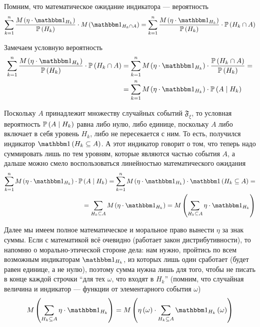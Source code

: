 Помним, что математическое ожидание индикатора --- вероятность
$$\sum_{k=1}^n
    \frac{\mean{\left( \eta \cdot \indicatorof{H_k} \right)}}{\probability{H_k}}
        \cdot \mean{\left( \indicatorof{H_k \cap A} \right)}
    = \sum_{k=1}^n \frac{\mean{\left( \eta \cdot \indicatorof{H_k} \right)}}
        {\probability{H_k}}
        \cdot \probability{H_k \cap A}$$

Замечаем условную вероятность
\begin{align*}
    \sum_{k=1}^n \frac{\mean{\left( \eta \cdot \indicatorof{H_k} \right)}}
        {\probability{H_k}} \cdot \probability{H_k \cap A}
    &= \sum_{k=1}^n \mean{\left( \eta \cdot \indicatorof{H_k} \right)}
        \cdot \frac{\probability{H_k \cap A}}{\probability{H_k}} = \\
    &= \sum_{k=1}^n \mean{\left( \eta \cdot \indicatorof{H_k} \right)}
        \cdot \probability{A \mid H_k}
\end{align*}

Поскольку $A$ принадлежит множеству случайных событий $\mathfrak{F}_\xi$,
то условная вероятность $\mathbb{P}\left( A\mid H_k \right)$ равна либо нулю, либо единице,
поскольку $A$ либо включает в себя уровень $H_k$, либо не пересекается с ним.
То есть, получился индикатор $\indicator{H_k \subseteq A}$.
А этот индикатор говорит о том, что теперь надо суммировать лишь по тем уровням,
которые являются частью события $A$,
а дальше можно смело воспользоваться линейностью математического ожидания
\begin{align*}
\sum_{k=1}^n \mean{\left( \eta \cdot \indicatorof{H_k} \right)}
    \cdot \probability{A \mid H_k}
    = \sum_{k=1}^n \mean{\left( \eta \cdot \indicatorof{H_k} \right)}
        \cdot \indicator{H_k \subseteq A} = \\
    = \sum_{H_k \subseteq A} \mean{\left( \eta \cdot \indicatorof{H_k} \right)}
    = \mean{\left( \sum_{H_k \subseteq A} \eta \cdot \indicatorof{H_k} \right)}
\end{align*}

Далее мы имеем полное математическое и моральное право
вынести $\eta$ за знак суммы.
Если с математикой всё очевидно (работает закон дистрибутивности),
то напомню о морально-этической стороне дела: нам нужно,
пройтись по всем возможным индикаторам $\indicatorof{H_k}$,
из которых лишь один сработает (будет равен единице, а не нулю),
поэтому сумма нужна лишь для того,
чтобы не писать в конце каждой строчки ``для тех $\omega$, что входят в $H_k$''
(помним, что случайная величина и индикатор --- функции
от элементарного события $\omega$)
$$\mean{\left( \sum_{H_k \subseteq A} \eta \cdot \indicatorof{H_k} \right)}
    = \mean{\left( \eta \left( \omega \right) \cdot \sum_{H_k \subseteq A}
        \indicatorof{H_k}\left( \omega \right) \right)}$$

